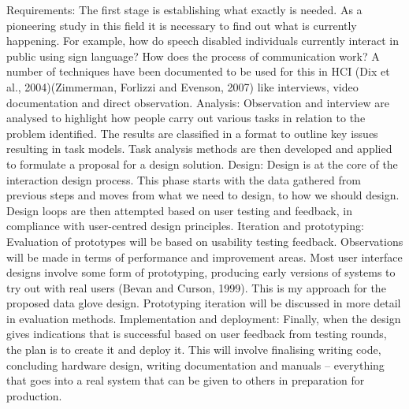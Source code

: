 Requirements: The first stage is establishing what exactly is needed. As a pioneering study in this field it is necessary to find out what is currently happening. For example, how do speech disabled individuals currently interact in public using sign language? How does the process of communication work? 
A number of techniques have been documented to be used for this in HCI (Dix et al., 2004)(Zimmerman, Forlizzi and Evenson, 2007) like interviews, video documentation and direct observation. 
Analysis: Observation and interview are analysed to highlight how people carry out various tasks in relation to the problem identified. The results are classified in a format to outline key issues resulting in task models. Task analysis methods are then developed and applied to formulate a proposal for a design solution. 
Design: Design is at the core of the interaction design process.  This phase starts with the data gathered from previous steps and moves from what we need to design, to how we should design.  Design loops are then attempted based on user testing and feedback, in compliance with user-centred design principles.  
Iteration and prototyping: Evaluation of prototypes will be based on usability testing feedback. Observations will be made in terms of performance and improvement areas.  Most user interface designs involve some form of prototyping, producing early versions of systems to try out with real users (Bevan and Curson, 1999). This is my approach for the proposed data glove design. Prototyping iteration will be discussed in more detail in evaluation methods. 
Implementation and deployment: Finally, when the design gives indications that is successful based on user feedback from testing rounds, the plan is to create it and deploy it. This will involve finalising writing code, concluding hardware design, writing documentation and manuals – everything that goes into a real system that can be given to others in preparation for production. 
